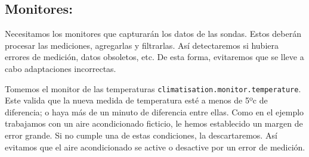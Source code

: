 \subsection{Monitores:}

Necesitamos los monitores que capturarán los datos de las sondas. Estos deberán procesar las mediciones, agregarlas y filtrarlas. Así detectaremos si hubiera errores de medición, datos obsoletos, etc. De esta forma, evitaremos que se lleve a cabo adaptaciones incorrectas.

Tomemos el monitor de las temperaturas \texttt{climatisation.monitor.temperature}. Este valida que la nueva medida de temperatura esté a menos de 5ºc de diferencia; o haya más de un minuto de diferencia entre ellas. Como en el ejemplo trabajamos con un aire acondicionado ficticio, le hemos establecido un margen de error grande. Si no cumple una de estas condiciones, la descartaremos. Así evitamos que el aire acondicionado se active o desactive por un error de medición.

